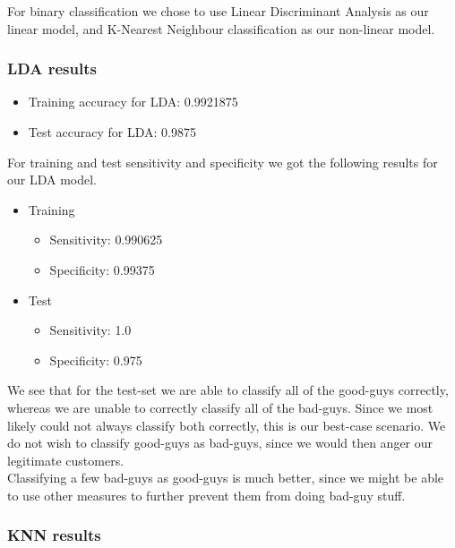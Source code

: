 \documentclass[12pt]{article}
\begin{document}
For binary classification we chose to use Linear Discriminant Analysis as our linear model, and K-Nearest Neighbour classification as our non-linear model.

\subsubsection{LDA results}

\begin{itemize}
	\item Training accuracy for LDA: 0.9921875
	\item Test accuracy for LDA: 0.9875
\end{itemize}

\noindent For training and test sensitivity and specificity we got the following results for our LDA model.

\begin{itemize}
	\item Training
		\begin{itemize}
			\item Sensitivity: 0.990625 %
			\item Specificity: 0.99375 %
		\end{itemize}
	\item Test
		\begin{itemize}
			\item Sensitivity: 1.0
			\item Specificity: 0.975
		\end{itemize}
\end{itemize}

\noindent We see that for the test-set we are able to classify all of the good-guys correctly, whereas we are unable to correctly classify all of the bad-guys. Since we most likely could not always classify both correctly, this is our best-case scenario. We do not wish to classify good-guys as bad-guys, since we would then anger our legitimate customers. \\
Classifying a few bad-guys as good-guys is much better, since we might be able to use other measures to further prevent them from doing bad-guy stuff.

\newpage

\subsubsection{KNN results}
\label{section:binary classification - knn}
\end{document}

